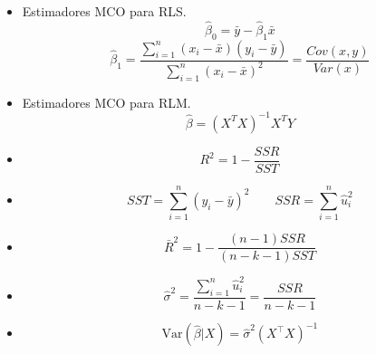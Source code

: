 \documentclass[10pt,a4paper]{article}
\begin{document}
\begin{itemize}

\item  Estimadores MCO para RLS.
{
$$\hat{\beta}_0 = \bar{y} - \hat{\beta}_1 \bar{x} $$
$$\hat{\beta}_1 = \frac{\sum_{i=1}^{n}(x_i - \bar{x})(y_i-\bar{y})}{\sum_{i=1}^{n}(x_i - \bar{x})^2}=\frac{Cov(x,y)}{Var(x)}$$}


\item  Estimadores MCO para RLM.
{
$${\hat{\beta}} = (X^TX)^{-1} X^TY $$}


    \item \[ R^2  = 1 - \frac{SSR}{SST} \] 
\item  $$SST = \sum_{i=1}^{n} (y_i - \bar{y})^2 \quad \quad SSR = \sum_{i=1}^{n}  \hat{u}_i^2 $$
    \item \[ \bar{R}^2 =  1 - \frac{(n-1)SSR}{(n-k-1)SST} \]

    \item  $$\hat{\sigma}^2 = \frac{\sum_{i=1}^{n} \hat{u}_i^2 }{n-k-1}= \frac{SSR}{n - k - 1}$$
    \item \[
\text{Var}(\hat{\beta}|X) = \hat{\sigma}^2(X^{\top}X)^{-1}
\]
    \end{itemize}
\end{document}
